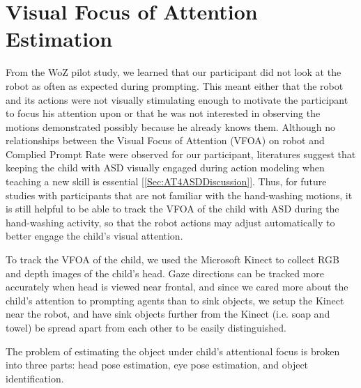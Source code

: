 \chapter{Visual Focus of Attention Estimation}
From the WoZ pilot study, we learned that our participant did not look at the robot as often as expected during prompting.  This meant either that the robot and its actions were not visually stimulating enough to motivate the participant to focus his attention upon or that he was not interested in observing the motions demonstrated possibly because he already knows them.  Although no relationships between the Visual Focus of Attention (VFOA) on robot and Complied Prompt Rate were observed for our participant, literatures suggest that keeping the child with ASD visually engaged during action modeling when teaching a new skill is essential [\ref{Sec:AT4ASDDiscussion}].  Thus, for future studies with participants that are not familiar with the hand-washing motions, it is still helpful to be able to track the VFOA of the child with ASD during the hand-washing activity, so that the robot actions may adjust automatically to better engage the child's visual attention.

To track the VFOA of the child, we used the Microsoft Kinect to collect RGB and depth images of the child's head.  Gaze directions can be tracked more accurately when head is viewed near frontal, and since we cared more about the child's attention to prompting agents than to sink objects, we setup the Kinect near the robot, and have sink objects further from the Kinect (i.e. soap and towel) be spread apart from each other to be easily distinguished.

The problem of estimating the object under child's attentional focus is broken into three parts: head pose estimation, eye pose estimation, and object identification.


%
%	
%	







